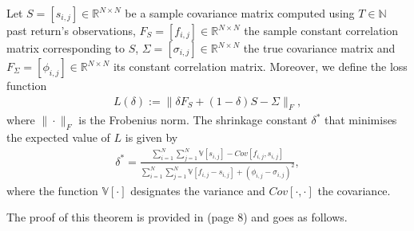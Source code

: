    	\begin{theorem}\label{optimalshrinkageconstantheorem}
    	        Let $S = [s_{i,j}] \in \mathbb{R}^{N \times N}$ be a sample covariance matrix computed using $T \in \mathbb{N}$ past return's observations, $F_S = [f_{i,j}] \in \mathbb{R}^{N \times N}$ the sample constant correlation matrix corresponding to $S$, $\Sigma = [\sigma_{i,j}] \in \mathbb{R}^{N \times N}$ the true covariance matrix and $F_\Sigma = [\phi_{i,j}] \in \mathbb{R}^{N \times N}$ its constant correlation matrix. Moreover, we define the loss function
    	        \begin{align*}
    	            L(\delta) := \| \delta F_S + (1-\delta) S - \Sigma \|_F,
    	        \end{align*}
    	        where $\| \cdot \|_F$ is the Frobenius norm. The shrinkage constant $\delta^*$ that minimises the expected value of $L$ is given by
    	        \begin{align}\label{optimalshrinkageconstant}
    	            \delta^* = \frac{\sum_{i=1}^N \sum_{j=1}^N \mathbb{V}[s_{i,j}] - Cov[f_{i,j}, s_{i,j}]}{\sum_{i=1}^N \sum_{j=1}^N \mathbb{V}[f_{i,j} - s_{i,j}] + (\phi_{i,j} - \sigma_{i,j})^2},
    	        \end{align}
    	        where the function $\mathbb{V}[\cdot]$ designates the variance and $Cov[\cdot, \cdot]$ the covariance.
    	\end{theorem}
    	
    	The proof of this theorem is provided in \cite{ledoit2003} (page 8) and goes as follows.
    	
